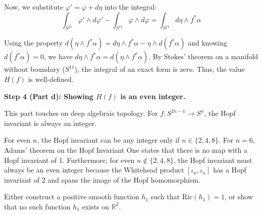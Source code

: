 \begin{solution}
Now, we substitute $\varphi' = \varphi + d\eta$ into the integral:
\[ \int_{S^{11}} \varphi' \wedge d\varphi' - \int_{S^{11}} \varphi \wedge d\varphi = \int_{S^{11}} d\eta \wedge f^* \alpha \]

Using the property $d(\eta \wedge f^* \alpha) = d\eta \wedge f^* \alpha - \eta \wedge d(f^* \alpha)$ and knowing $d(f^* \alpha) = 0$, we have $d\eta \wedge f^* \alpha = d(\eta \wedge f^* \alpha)$. By Stokes' theorem on a manifold without boundary ($S^{11}$), the integral of an exact form is zero. Thus, the value $H(f)$ is well-defined.

\textbf{Step 4 (Part d): Showing $H(f)$ is an even integer.}

This part touches on deep algebraic topology. For $f: S^{2n-1} \to S^n$, the Hopf invariant is always an integer.

For even $n$, the Hopf invariant can be any integer only if $n \in \{2, 4, 8\}$. For $n=6$, Adams' theorem on the Hopf Invariant One states that there is no map with a Hopf invariant of 1. Furthermore, for even $n \notin \{2, 4, 8\}$, the Hopf invariant must always be an even integer because the Whitehead product $[\iota_n, \iota_n]$ has a Hopf invariant of 2 and spans the image of the Hopf homomorphism.
\end{solution}

\begin{exercise}
\label{geometry:2020:2}
Either construct a positive smooth function $h_{1}$ such that $\mathrm{Ric}(h_{1}) = 1$, or show that no such function $h_{1}$ exists on $\mathbb{R}^2$.
\end{exercise}

